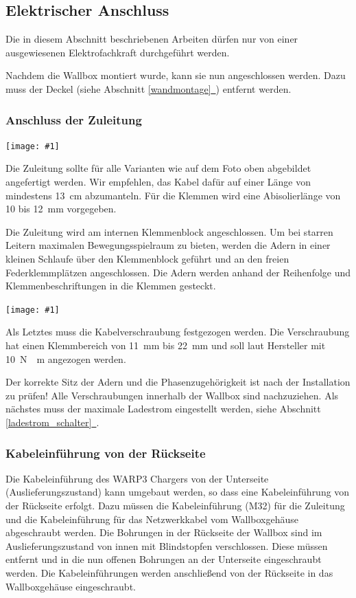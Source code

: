 \documentclass[a4paper,10pt]{article}
\newcommand{\hint}[1]{\begin{tcolorbox}[colback=boxgray,colframe=black,coltext=
white,title=Hinweis,left*=2mm,right*=2mm,boxsep=1mm,bottom=1mm,top=1mm]#1\end{tcolorbox}}
\newcommand{\gfx}[1]{\texttt{[image: \#1]}}
\newcommand*{\fullref}[1]{Abschnitt \hyperref[{#1}]{\ref*{#1}~\nameref*{#1}}}
\begin{document}
\begin{multicols*}{2}
    \subsection{Elektrischer Anschluss}
    \hint{Die in diesem Abschnitt beschriebenen Arbeiten dürfen nur von einer ausgewiesenen
        Elektrofachkraft durchgeführt werden.}

    Nachdem die Wallbox montiert wurde, kann sie nun angeschlossen werden. Dazu
    muss der Deckel (siehe \fullref{wandmontage}) entfernt werden.

    \subsubsection{Anschluss der Zuleitung}
    \gfx{./img_warp3/resized/warp_cable_cut_ready}

    Die Zuleitung sollte für alle Varianten wie auf dem Foto oben abgebildet
    angefertigt werden. Wir empfehlen, das Kabel dafür auf einer Länge von
	mindestens \SI{13}{\centi\meter} abzumanteln. Für die Klemmen wird eine
    Abisolierlänge von 10 bis \SI{12}{\milli\meter} vorgegeben.

    Die Zuleitung wird am internen Klemmenblock
    angeschlossen. Um bei starren Leitern maximalen Bewegungsspielraum zu bieten,
    werden die Adern in einer kleinen Schlaufe über den Klemmenblock geführt
	und an den freien Federklemmplätzen angeschlossen. Die Adern werden anhand der Reihenfolge und
    Klemmenbeschriftungen in die Klemmen gesteckt.

    \gfx{./img_warp3/resized/warp3_smart_open_connected}

    Als Letztes muss die Kabelverschraubung festgezogen werden. Die Verschraubung
    hat einen Klemmbereich von \SI{11}{\milli\meter} bis \SI{22}{\milli\meter} und soll laut Hersteller mit
    \SI{10}{\newton{}\meter} angezogen werden.

    Der korrekte Sitz der Adern und die Phasenzugehörigkeit ist nach der
    Installation zu prüfen! Alle Verschraubungen innerhalb der Wallbox sind nachzuziehen.
    Als nächstes muss der maximale Ladestrom eingestellt werden, siehe
	\fullref{ladestrom_schalter}.

    \subsubsection{Kabeleinführung von der Rückseite}
    Die Kabeleinführung des WARP3 Chargers von der Unterseite
    (Auslieferungszustand) kann umgebaut werden, so dass eine Kabeleinführung von der
    Rückseite erfolgt. Dazu müssen die Kabeleinführung (M32) für die Zuleitung und die
    Kabeleinführung für das Netzwerkkabel vom Wallboxgehäuse abgeschraubt
    werden. Die Bohrungen in der Rückseite der Wallbox sind im
    Auslieferungszustand von innen mit Blindstopfen verschlossen.
    Diese müssen entfernt und in die nun offenen Bohrungen an der Unterseite
    eingeschraubt werden. Die Kabeleinführungen werden anschließend von
    der Rückseite in das Wallboxgehäuse eingeschraubt.


\end{multicols*}
\end{document}
